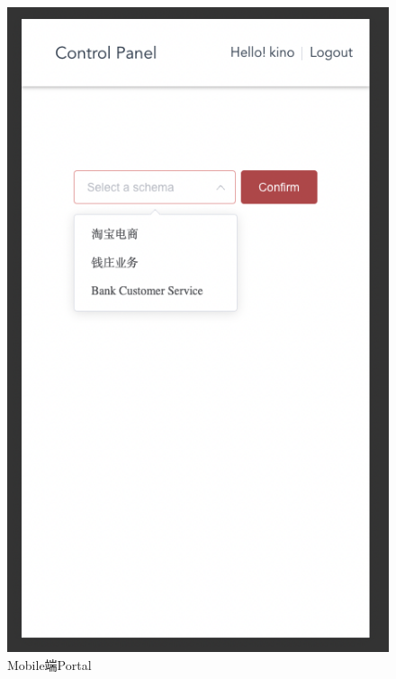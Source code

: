 \documentclass[hyperref]{ctexart}
\begin{document}
\begin{multicols}{2}
\begin{figure}[H]
        \includegraphics[scale=0.22]{figure/11.png}
        \caption{Mobile端Portal}
        \label{Fig.1.11}
    \end{figure}
    \begin{figure}[H]
        \centering

\end{figure}
\end{multicols}
\end{document}
